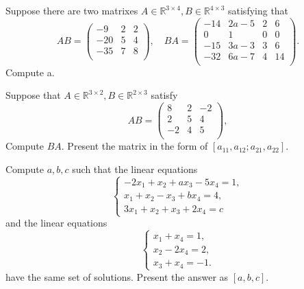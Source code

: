 \begin{problem} Suppose there are two matrixes $A\in \mathbb{R}^{3\times 4},B\in \mathbb{R}^{4\times 3}$ satisfying that
\[AB=\left(
       \begin{array}{ccc}
         -9 & 2 & 2 \\
         -20 & 5 & 4 \\
         -35 & 7 & 8 \\
       \end{array}
     \right),\quad  BA=\left(
                         \begin{array}{cccc}
                           -14 & 2a-5 & 2 & 6 \\
                           0 & 1 & 0 & 0 \\
                           -15 & 3a-3 & 3 & 6 \\
                           -32 & 6a-7 & 4 & 14 \\
                         \end{array}
                       \right).
\]
Compute a.
\end{problem}

\begin{problem} Suppose that $A\in \mathbb{R}^{3\times 2}, B\in \mathbb{R}^{2\times 3}$ satisfy
\[AB=\left(
       \begin{array}{ccc}
         8 & 2 & -2 \\
         2 & 5 & 4 \\
         -2 & 4 & 5 \\
       \end{array}
     \right),
\]
Compute $BA$. Present the matrix in the form of $[a_{11},a_{12};a_{21},a_{22}]$. 
\end{problem}

\begin{problem} Compute $a,b,c$ such that the linear equations
\[\left\{\begin{array}{l}
    -2x_1+x_2+ax_3-5x_4=1, \\
    x_1+x_2-x_3+bx_4=4, \\
   3x_1+x_2+x_3+2x_4=c
  \end{array}\right.
\]
and the linear equations
\[\left\{\begin{array}{l}
    x_1+x_4=1, \\
    x_2-2x_4=2, \\
   x_3+x_4=-1.
  \end{array}\right.
\]
have the same set of solutions. Present the answer as $[a,b,c]$.  
\end{problem}

